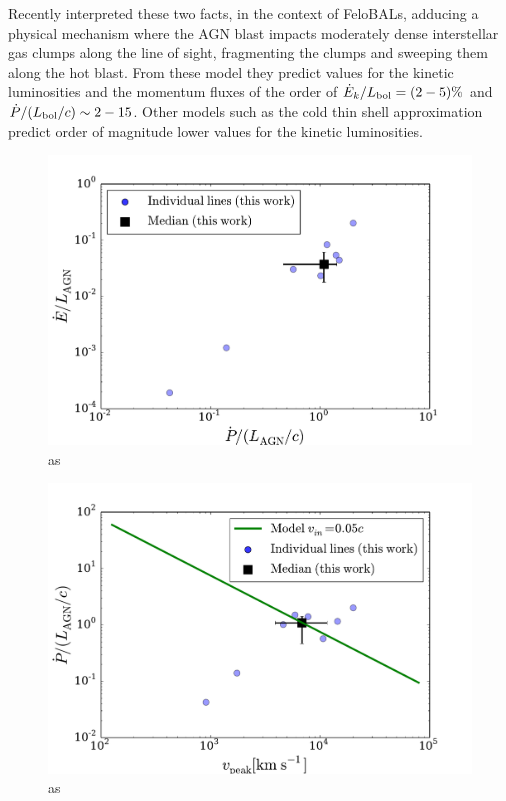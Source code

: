 \documentclass{report}
\begin{document}
Recently \cite{Faucher-Giguere2012} interpreted these two facts, in
the context of FeloBALs, adducing a physical mechanism where the AGN
blast impacts moderately dense interstellar gas clumps along the line
of sight, fragmenting the clumps and sweeping them along the hot
blast. From these model they predict values for the kinetic
luminosities and the momentum fluxes of the order of $\dot{E}_k/L_{\rm
bol}= (2-5)\%$ and $\dot{P}/(L_{\rm bol}/c)\sim 2-15$. Other models
such as the cold thin shell approximation predict order of magnitude
lower values for the kinetic luminosities. 



\begin{figure}
\begin{center}
\includegraphics[width=0.9\linewidth,angle=0]{ep_ratio.pdf}
\caption{as\label{fig:ep_vales}}
\end{center}
\end{figure}

\begin{figure}
\begin{center}
\includegraphics[width=0.9\linewidth,angle=0]{p_ratio_theory.pdf}
\caption{as\label{fig:p_ratio}}
\end{center}
\end{figure}





 
\end{document}
